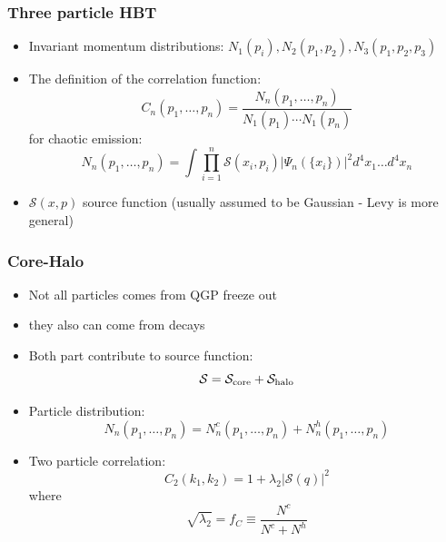 \documentclass{beamer}
\begin{document}
\begin{frame}
\frametitle{Three particle HBT}
\begin{itemize}
\setlength{\itemsep}{8pt}
\item Invariant momentum distributions: $N_1(p_i), N_2(p_1,p_2),N_3(p_1, p_2, p_3)$
\item The definition of the correlation function:
\begin{equation*}
C_n(p_1,\dots,p_n)=\frac{N_n(p_1,\dots,p_n)}{N_1(p_1)\cdots N_1(p_n)}
\end{equation*}
 for chaotic emission:
\begin{equation*}
N_n(p_1,\dots,p_n)=\int \prod_{i=1}^{n}\mathcal{S}(x_i,p_i)|\Psi_{n}(\{x_i\})|^2 d^4x_1\dots d^4x_n
\end{equation*}
\item $\mathcal{S}(x,p)$ source function (usually assumed to be Gaussian - Levy is more general)
\end{itemize}
\end{frame}

\begin{frame}
\frametitle{Core-Halo}
\begin{itemize}
\setlength{\itemsep}{8pt}
\item Not all particles comes from QGP freeze out
\item they also can come from decays
\item Both part contribute to source function:
\begin{equation*}
\mathcal{S}=\mathcal{S}_{\rm core}+\mathcal{S}_{\rm halo}
\end{equation*}
\item Particle distribution:
\begin{equation*}
N_n(p_1,\dots,p_n) = N_n^{c}(p_1,\dots,p_n)+N_n^{h}(p_1,\dots,p_n)
\end{equation*}
\item Two particle correlation:
\begin{equation*}
C_2(k_1, k_2) =  1+\lambda_2|\mathcal{S}(q)|^2
\end{equation*}
where
\begin{equation*}
\sqrt{\lambda_2} =  f_C \equiv \frac{N^c}{N^c+N^h} 
\end{equation*}
\end{itemize}
\end{frame}
\end{document}
